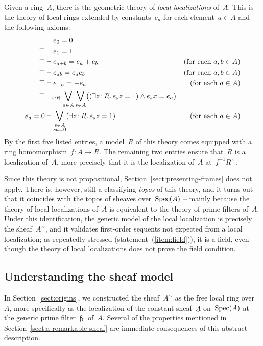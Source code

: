 \documentclass{ws-rv9x6}
\begin{document}
{\begin{remark}Given a ring~$A$, there is the geometric theory of \emph{local
localizations} of~$A$. This is the theory of local rings extended by constants~$e_a$
for each element~$a \in A$ and the following axioms:
\begin{align*}
  \top &\vdash e_0 = 0 \\
  \top &\vdash e_1 = 1 \\
  \top &\vdash e_{a + b} = e_a + e_b & \text{(for each~$a,b \in A$)} \\
  \top &\vdash e_{ab} = e_a e_b & \text{(for each~$a,b \in A$)} \\
  \top &\vdash e_{-a} = -e_a & \text{(for each~$a \in A$)} \\
  \top &\vdash_{x:R} \bigvee_{a \in A} \bigvee_{s \in A} \bigl((\exists z\,{:}\,R\mathpunct{.}
  e_s z = 1) \wedge e_s x = e_a\bigr) \\
  e_a = 0 &\vdash \bigvee_{\substack{s \in A\\sa = 0}} (\exists z\,{:}\,R\mathpunct{.} e_s z = 1) & \text{(for each~$a \in A$)}
\end{align*}
By the first five listed entries, a model~$R$ of this theory comes equipped
with a ring homomorphism~$f : A \to R$. The remaining two entries ensure that~$R$ is
a localization of~$A$, more precisely that it is the localization of~$A$
at~$f^{-1}R^\times$.

Since this theory is not propositional, Section~\ref{sect:presenting-frames}
does not apply. There is, however, still a classifying \emph{topos} of this theory, and it turns
out that it coincides with the topos of sheaves over~$\mathrm{Spec}(A)$ -- mainly
because the theory of local localizations of~$A$ is equivalent to the theory of
prime filters of~$A$. Under this identification, the generic model of the local
localization is precisely the sheaf~$A^\sim$, and it validates first-order
sequents not expected from a local localization; as repeatedly stressed
(statement~(\ref{item:field})), it is a field, even though the theory of local
localizations does not prove the field condition.
\end{remark}


\subsection{Understanding the sheaf model}
\label{sect:understanding}

In Section~\ref{sect:origins}, we constructed the sheaf~$A^\sim$ as the free
local ring over~$A$, more specifically as the localization of the constant
sheaf~$\underline{A}$ on~$\mathrm{Spec}(A)$ at the generic prime filter~$\mathfrak{f}_0$
of~$A$. Several of the properties mentioned in
Section~\ref{sect:a-remarkable-sheaf} are immediate consequences of this
abstract description.

}
\end{document}
